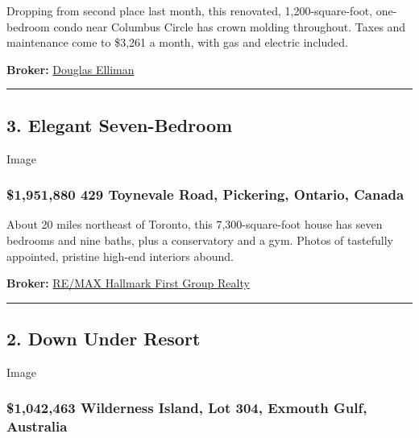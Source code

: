 Dropping from second place last month, this renovated,
1,200-square-foot, one-bedroom condo near Columbus Circle has crown
molding throughout. Taxes and maintenance come to \$3,261 a month, with
gas and electric included.

\textbf{Broker:}
\href{https://www.nytimes3xbfgragh.onion/real-estate/usa/ny/new-york/hells-kitchen/homes-for-sale/the-parc-vendome-350-west-57th-st/46-4173209?channel=sale\&locations\%5B\%5D=new-york-ny-usa\%2F350-West-57th-Street-building}{Douglas
Elliman}

\begin{center}\rule{0.5\linewidth}{\linethickness}\end{center}

\hypertarget{3-elegant-seven-bedroom}{%
\subsection{3. Elegant Seven-Bedroom}\label{3-elegant-seven-bedroom}}

Image

\hypertarget{1951880--429-toynevale-road-pickering-ontario-canada}{%
\subsubsection{\$1,951,880 \textbar{} 429 Toynevale Road, Pickering,
Ontario,
Canada}\label{1951880--429-toynevale-road-pickering-ontario-canada}}

About 20 miles northeast of Toronto, this 7,300-square-foot house has
seven bedrooms and nine baths, plus a conservatory and a gym. Photos of
tastefully appointed, pristine high-end interiors abound.

\textbf{Broker:}
\href{https://www.nytimes3xbfgragh.onion/real-estate/can/on/pickering/homes-for-sale/429-toynevale-rd/2712-63108311?channel=sale}{RE/MAX
Hallmark First Group Realty}

\begin{center}\rule{0.5\linewidth}{\linethickness}\end{center}

\hypertarget{2-down-under-resort}{%
\subsection{2. Down Under Resort}\label{2-down-under-resort}}

Image

\hypertarget{1042463--wilderness-island-lot-304-exmouth-gulf-australia}{%
\subsubsection{\$1,042,463 \textbar{} Wilderness Island, Lot 304,
Exmouth Gulf,
Australia}\label{1042463--wilderness-island-lot-304-exmouth-gulf-australia}}

